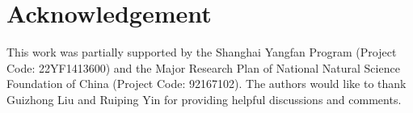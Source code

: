 \documentclass[pdflatex,sn-mathphys]{sn-jnl}%
\theoremstyle{thmstyleone}%
\theoremstyle{thmstyletwo}%
\theoremstyle{thmstylethree}%
\begin{document}
\section*{Acknowledgement}
This work was partially supported by the Shanghai Yangfan Program (Project Code: 22YF1413600) and the Major Research Plan of National Natural Science Foundation of China (Project Code: 92167102). The authors would like to thank Guizhong Liu and Ruiping Yin for providing helpful discussions and comments. 











\end{document}
